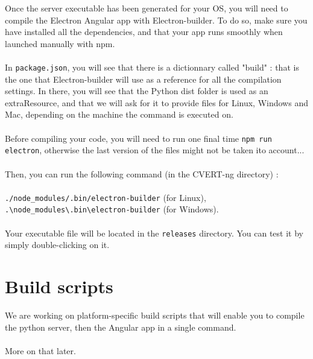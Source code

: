 \documentclass[12pt,a4paper]{article}
\begin{document}
Once the server executable has been generated for your OS, you will need to compile the Electron Angular app with Electron-builder. To do so, make sure you have installed all the dependencies, and that your app runs smoothly when launched manually with npm.\\
~\\
In \texttt{package.json}, you will see that there is a dictionnary called "build" : that is the one that Electron-builder will use as a reference for all the compilation settings. In there, you will see that the Python dist folder is used as an extraResource, and that we will ask for it to provide files for Linux, Windows and Mac, depending on the machine the command is executed on.\\
~\\
Before compiling your code, you will need to run one final time \texttt{npm run electron}, otherwise the last version of the files might not be taken ito account...\\
~\\
Then, you can run the following command (in the CVERT-ng directory) :\\
~\\
\texttt{./node\_modules/.bin/electron-builder} (for Linux),\\
\texttt{.\textbackslash node\_modules\textbackslash .bin\textbackslash electron-builder} (for Windows).\\
~\\
Your executable file will be located in the \texttt{releases} directory. You can test it by simply double-clicking on it.

\section{Build scripts}

We are working on platform-specific build scripts that will enable you to compile the python server, then the Angular app in a single command.\\
~\\
More on that later.
\end{document}

